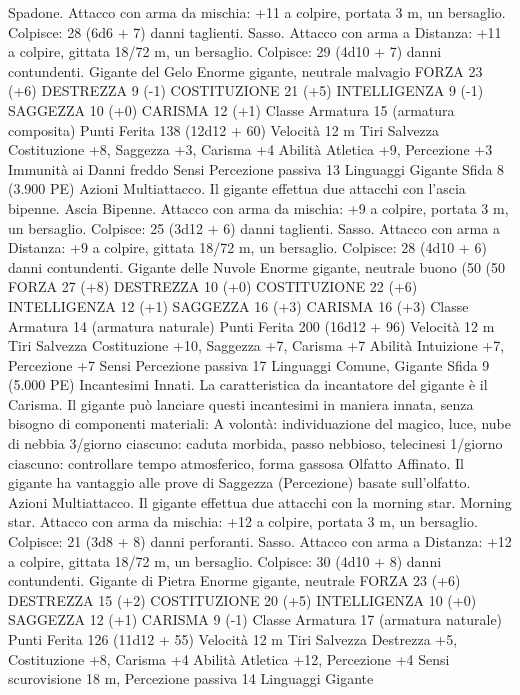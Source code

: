 \begin{multicols}{2}
Spadone. Attacco con arma da mischia: +11 a colpire, portata 3
m, un bersaglio.
Colpisce: 28 (6d6 + 7) danni taglienti.
Sasso. Attacco con arma a Distanza: +11 a colpire, gittata 18/72
m, un bersaglio.
Colpisce: 29 (4d10 + 7) danni contundenti.
Gigante del Gelo
Enorme gigante, neutrale malvagio
FORZA 23 (+6)
DESTREZZA 9 (-1)
COSTITUZIONE 21 (+5)
INTELLIGENZA 9 (-1)
SAGGEZZA 10 (+0)
CARISMA 12 (+1)
Classe Armatura 15 (armatura composita)
Punti Ferita 138 (12d12 + 60)
Velocità 12 m
Tiri Salvezza Costituzione +8, Saggezza +3, Carisma +4
Abilità Atletica +9, Percezione +3
Immunità ai Danni freddo
Sensi Percezione passiva 13
Linguaggi Gigante
Sfida 8 (3.900 PE)
Azioni
Multiattacco. Il gigante effettua due attacchi con l’ascia bipenne.
Ascia Bipenne. Attacco con arma da mischia: +9 a colpire,
portata 3 m, un bersaglio.
Colpisce: 25 (3d12 + 6) danni taglienti.
Sasso. Attacco con arma a Distanza: +9 a colpire, gittata 18/72
m, un bersaglio.
Colpisce: 28 (4d10 + 6) danni contundenti.
Gigante delle Nuvole
Enorme gigante, neutrale buono (50%
(50%
FORZA 27 (+8)
DESTREZZA 10 (+0)
COSTITUZIONE 22 (+6)
INTELLIGENZA 12 (+1)
SAGGEZZA 16 (+3)
CARISMA 16 (+3)
Classe Armatura 14 (armatura naturale)
Punti Ferita 200 (16d12 + 96)
Velocità 12 m
Tiri Salvezza Costituzione +10, Saggezza +7, Carisma +7
Abilità Intuizione +7, Percezione +7
Sensi Percezione passiva 17
Linguaggi Comune, Gigante
Sfida 9 (5.000 PE)
Incantesimi Innati. La caratteristica da incantatore del gigante è
il Carisma. Il gigante può lanciare questi incantesimi in maniera
innata, senza bisogno di componenti materiali:
A volontà: individuazione del magico, luce, nube di nebbia
3/giorno ciascuno: caduta morbida, passo nebbioso, telecinesi
1/giorno ciascuno: controllare tempo atmosferico, forma gassosa
Olfatto Affinato. Il gigante ha vantaggio alle prove di Saggezza
(Percezione) basate sull’olfatto.
Azioni
Multiattacco. Il gigante effettua due attacchi con la morning star.
Morning star. Attacco con arma da mischia: +12 a colpire,
portata 3 m, un bersaglio.
Colpisce: 21 (3d8 + 8) danni perforanti.
Sasso. Attacco con arma a Distanza: +12 a colpire, gittata 18/72
m, un bersaglio.
Colpisce: 30 (4d10 + 8) danni contundenti. 
Gigante di Pietra
Enorme gigante, neutrale
FORZA 23 (+6)
DESTREZZA 15 (+2)
COSTITUZIONE 20 (+5)
INTELLIGENZA 10 (+0)
SAGGEZZA 12 (+1)
CARISMA 9 (-1)
Classe Armatura 17 (armatura naturale)
Punti Ferita 126 (11d12 + 55)
Velocità 12 m
Tiri Salvezza Destrezza +5, Costituzione +8, Carisma +4
Abilità Atletica +12, Percezione +4
Sensi scurovisione 18 m, Percezione passiva 14
Linguaggi Gigante

\end{multicols}

